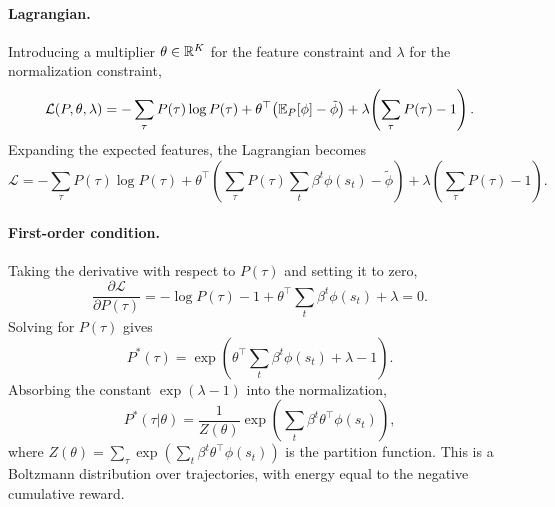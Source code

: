\documentclass[10pt]{article}
\begin{document}
\paragraph{Lagrangian.}
Introducing a multiplier $\theta \in \mathbb{R}^K$ for the feature constraint and $\lambda$ for the normalization constraint,
\begin{equation}
\label{eq:maxent_lagrangian}
\mathcal{L}(P, \theta, \lambda) = -\sum_\tau P(\tau) \log P(\tau) + \theta^\top\!\left(\mathbb{E}_P[\phi] - \tilde\phi\right) + \lambda\!\left(\sum_\tau P(\tau) - 1\right).
\end{equation}
Expanding the expected features, the Lagrangian becomes
\begin{equation}
\mathcal{L} = -\sum_\tau P(\tau) \log P(\tau) + \theta^\top\!\left(\sum_\tau P(\tau) \sum_t \beta^t \phi(s_t) - \tilde\phi\right) + \lambda\!\left(\sum_\tau P(\tau) - 1\right).
\end{equation}

\paragraph{First-order condition.}
Taking the derivative with respect to $P(\tau)$ and setting it to zero,
\begin{equation}
\frac{\partial \mathcal{L}}{\partial P(\tau)} = -\log P(\tau) - 1 + \theta^\top \sum_t \beta^t \phi(s_t) + \lambda = 0.
\end{equation}
Solving for $P(\tau)$ gives
\begin{equation}
P^*(\tau) = \exp\!\left(\theta^\top \sum_t \beta^t \phi(s_t) + \lambda - 1\right).
\end{equation}
Absorbing the constant $\exp(\lambda - 1)$ into the normalization,
\begin{equation}
\label{eq:boltzmann_traj}
P^*(\tau|\theta) = \frac{1}{Z(\theta)} \exp\!\left(\sum_t \beta^t \theta^\top \phi(s_t)\right),
\end{equation}
where $Z(\theta) = \sum_\tau \exp\!\left(\sum_t \beta^t \theta^\top \phi(s_t)\right)$ is the partition function. This is a Boltzmann distribution over trajectories, with energy equal to the negative cumulative reward.
\end{document}
